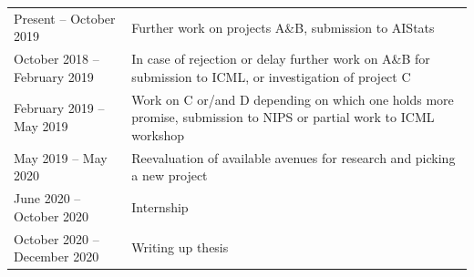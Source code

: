 \documentclass[12pt]{article}
\begin{document}
\begin{table}[h!]
\begin{tabular}{lp{11cm}}
Present -- October 2019         & Further work on projects A\&B, submission to AIStats \\
October 2018 -- February 2019   & In case of rejection or delay further work on A\&B for submission to ICML, or investigation of project C \\
February 2019 -- May 2019       & Work on C or/and D depending on which one holds more promise, submission to NIPS or partial work to ICML workshop \\
May 2019 -- May 2020            & Reevaluation of available avenues for research and picking a new project \\
June 2020 -- October 2020       & Internship \\
October 2020 -- December 2020   & Writing up thesis
\end{tabular}
\end{table}

\newpage 

 



% 
\end{document}
